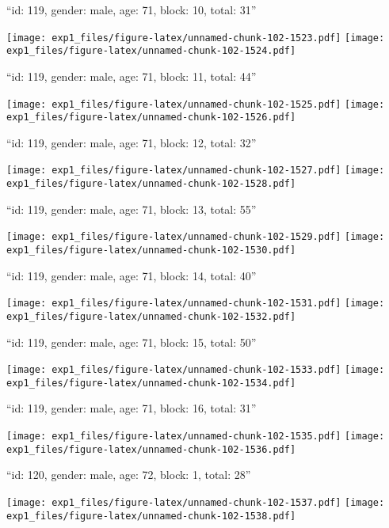 \documentclass[11pt,,]{article}
\begin{document}
\newpage
[1] 

``id: 119, gender: male, age: 71, block: 10, total: 31''

\texttt{[image: exp1\_files/figure-latex/unnamed-chunk-102-1523.pdf]}
\texttt{[image: exp1\_files/figure-latex/unnamed-chunk-102-1524.pdf]}

\newpage
[1] 

``id: 119, gender: male, age: 71, block: 11, total: 44''

\texttt{[image: exp1\_files/figure-latex/unnamed-chunk-102-1525.pdf]}
\texttt{[image: exp1\_files/figure-latex/unnamed-chunk-102-1526.pdf]}

\newpage
[1] 

``id: 119, gender: male, age: 71, block: 12, total: 32''

\texttt{[image: exp1\_files/figure-latex/unnamed-chunk-102-1527.pdf]}
\texttt{[image: exp1\_files/figure-latex/unnamed-chunk-102-1528.pdf]}

\newpage
[1] 

``id: 119, gender: male, age: 71, block: 13, total: 55''

\texttt{[image: exp1\_files/figure-latex/unnamed-chunk-102-1529.pdf]}
\texttt{[image: exp1\_files/figure-latex/unnamed-chunk-102-1530.pdf]}

\newpage
[1] 

``id: 119, gender: male, age: 71, block: 14, total: 40''

\texttt{[image: exp1\_files/figure-latex/unnamed-chunk-102-1531.pdf]}
\texttt{[image: exp1\_files/figure-latex/unnamed-chunk-102-1532.pdf]}

\newpage
[1] 

``id: 119, gender: male, age: 71, block: 15, total: 50''

\texttt{[image: exp1\_files/figure-latex/unnamed-chunk-102-1533.pdf]}
\texttt{[image: exp1\_files/figure-latex/unnamed-chunk-102-1534.pdf]}

\newpage
[1] 

``id: 119, gender: male, age: 71, block: 16, total: 31''

\texttt{[image: exp1\_files/figure-latex/unnamed-chunk-102-1535.pdf]}
\texttt{[image: exp1\_files/figure-latex/unnamed-chunk-102-1536.pdf]}

\newpage
[1] 

``id: 120, gender: male, age: 72, block: 1, total: 28''

\texttt{[image: exp1\_files/figure-latex/unnamed-chunk-102-1537.pdf]}
\texttt{[image: exp1\_files/figure-latex/unnamed-chunk-102-1538.pdf]}
\end{document}
